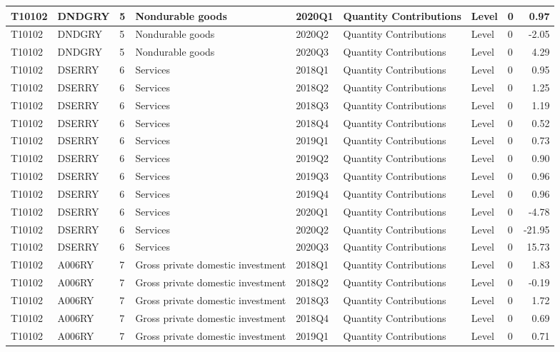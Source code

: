 \documentclass[
]{article}
\begin{document}
\begin{tabular}{l|l|l|l|l|l|l|l|r}
\hline
T10102 & DNDGRY & 5 & Nondurable goods & 2020Q1 & Quantity Contributions & Level & 0 & 0.97\\
\hline
T10102 & DNDGRY & 5 & Nondurable goods & 2020Q2 & Quantity Contributions & Level & 0 & -2.05\\
\hline
T10102 & DNDGRY & 5 & Nondurable goods & 2020Q3 & Quantity Contributions & Level & 0 & 4.29\\
\hline
T10102 & DSERRY & 6 & Services & 2018Q1 & Quantity Contributions & Level & 0 & 0.95\\
\hline
T10102 & DSERRY & 6 & Services & 2018Q2 & Quantity Contributions & Level & 0 & 1.25\\
\hline
T10102 & DSERRY & 6 & Services & 2018Q3 & Quantity Contributions & Level & 0 & 1.19\\
\hline
T10102 & DSERRY & 6 & Services & 2018Q4 & Quantity Contributions & Level & 0 & 0.52\\
\hline
T10102 & DSERRY & 6 & Services & 2019Q1 & Quantity Contributions & Level & 0 & 0.73\\
\hline
T10102 & DSERRY & 6 & Services & 2019Q2 & Quantity Contributions & Level & 0 & 0.90\\
\hline
T10102 & DSERRY & 6 & Services & 2019Q3 & Quantity Contributions & Level & 0 & 0.96\\
\hline
T10102 & DSERRY & 6 & Services & 2019Q4 & Quantity Contributions & Level & 0 & 0.96\\
\hline
T10102 & DSERRY & 6 & Services & 2020Q1 & Quantity Contributions & Level & 0 & -4.78\\
\hline
T10102 & DSERRY & 6 & Services & 2020Q2 & Quantity Contributions & Level & 0 & -21.95\\
\hline
T10102 & DSERRY & 6 & Services & 2020Q3 & Quantity Contributions & Level & 0 & 15.73\\
\hline
T10102 & A006RY & 7 & Gross private domestic investment & 2018Q1 & Quantity Contributions & Level & 0 & 1.83\\
\hline
T10102 & A006RY & 7 & Gross private domestic investment & 2018Q2 & Quantity Contributions & Level & 0 & -0.19\\
\hline
T10102 & A006RY & 7 & Gross private domestic investment & 2018Q3 & Quantity Contributions & Level & 0 & 1.72\\
\hline
T10102 & A006RY & 7 & Gross private domestic investment & 2018Q4 & Quantity Contributions & Level & 0 & 0.69\\
\hline
T10102 & A006RY & 7 & Gross private domestic investment & 2019Q1 & Quantity Contributions & Level & 0 & 0.71\\

\end{tabular}
\end{document}

